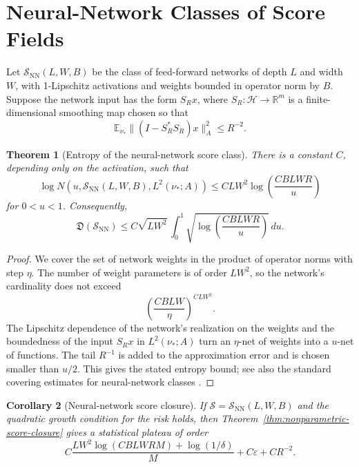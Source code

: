 \documentclass{article}
\newtheorem{theorem}{Theorem}[section]
\newtheorem{corollary}[theorem]{Corollary}
\newcommand{\Hh}{\mathcal H}
\newcommand{\E}{\mathbb E}
\begin{document}
\section{Neural-Network Classes of Score Fields}
\label{sec:nn-class}

Let \(\mathcal S_{\mathrm{NN}}(L,W,B)\) be the class of feed-forward networks of
depth \(L\) and width \(W\), with 1-Lipschitz activations and weights bounded in
operator norm by \(B\). Suppose the network input has the form \(S_Rx\), where
\(S_R:\Hh\to\mathbb R^m\) is a finite-dimensional smoothing map chosen so that
\[
        \E_{\nu_*}\|(I-S_R^*S_R)x\|_A^2\le R^{-2}.
\]

\begin{theorem}[Entropy of the neural-network score class]
\label{thm:nn-entropy}
There is a constant \(C\), depending only on the activation, such that
\[
        \log N(u,\mathcal S_{\mathrm{NN}}(L,W,B),L^2(\nu_*;A))
        \le
        C L W^2\log\left(\frac{CBLWR}{u}\right)
\]
for \(0<u<1\). Consequently,
\[
        \mathfrak D(\mathcal S_{\mathrm{NN}})
        \le
        C\sqrt{LW^2}\,
        \int_0^1
        \sqrt{\log\left(\frac{CBLWR}{u}\right)}\,du .
\]
\end{theorem}

\begin{proof}
We cover the set of network weights in the product of operator norms with step
\(\eta\). The number of weight parameters is of order \(LW^2\), so the network's
cardinality does not exceed
\[
        \left(\frac{CBLW}{\eta}\right)^{CLW^2}.
\]
The Lipschitz dependence of the network's realization on the weights and the
boundedness of the input \(S_Rx\) in \(L^2(\nu_*;A)\) turn an \(\eta\)-net of
weights into a \(u\)-net of functions. The tail \(R^{-1}\) is added to the
approximation error and is chosen smaller than \(u/2\). This gives the stated
entropy bound; see also the standard covering estimates for neural-network classes
\cite{AnthonyBartlett,Wainwright}.
\end{proof}

\begin{corollary}[Neural-network score closure]
\label{cor:nn-closure}
If \(\mathcal S=\mathcal S_{\mathrm{NN}}(L,W,B)\) and the quadratic growth
condition for the risk holds, then Theorem~\ref{thm:nonparametric-score-closure}
gives a statistical plateau of order
\[
        C\frac{LW^2\log(CBLWRM)+\log(1/\delta)}{M}
        +C\varepsilon+C R^{-2}.
\]
\end{corollary}
\end{document}

